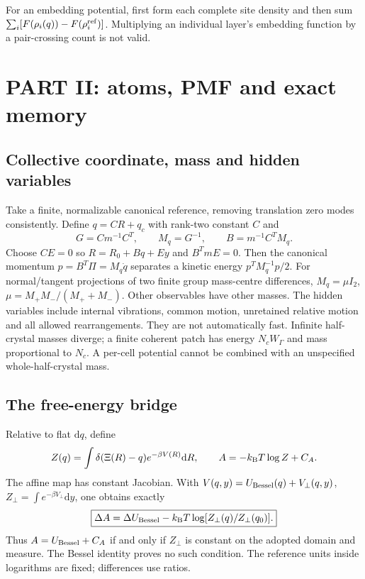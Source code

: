 \documentclass[11pt]{article}
\newcommand{\kb}{k_{\rm B}}
\newcommand{\dd}{\mathrm d}
\begin{document}
For an embedding potential, first form each complete site density and then
sum $\sum_i[F(\rho_i(q))-F(\rho_i^{\rm ref})]$. Multiplying an individual
layer's embedding function by a pair-crossing count is not valid.

\section{PART II: atoms, PMF and exact memory}
\subsection{Collective coordinate, mass and hidden variables}
Take a finite, normalizable canonical reference, removing translation zero
modes consistently. Define $q=CR+q_c$ with rank-two constant $C$ and
\begin{equation}
G=Cm^{-1}C^T,\qquad M_q=G^{-1},\qquad B=m^{-1}C^TM_q.
\end{equation}
Choose $CE=0$ so $R=R_0+Bq+Ey$ and $B^TmE=0$. Then the canonical momentum
$p=B^T\Pi=M_q\dot q$ separates a kinetic energy $p^TM_q^{-1}p/2$.
For normal/tangent projections of two finite group mass-centre differences,
$M_q=\mu I_2$, $\mu=M_+M_-/(M_++M_-)$. Other observables have other masses.
The hidden variables include internal vibrations, common motion, unretained
relative motion and all allowed rearrangements. They are not automatically
fast. Infinite half-crystal masses diverge; a finite coherent patch has
energy $N_cW_\Gamma$ and mass proportional to $N_c$. A per-cell potential
cannot be combined with an unspecified whole-half-crystal mass.

\subsection{The free-energy bridge}
Relative to flat $\dd q$, define
\begin{equation}
Z(q)=\int\delta(\Xi(R)-q)e^{-\beta V(R)}\dd R,\qquad
A=-\kb T\log Z+C_A.\label{eq:pmf}
\end{equation}
The affine map has constant Jacobian. With
$V(q,y)=U_{\rm Bessel}(q)+V_\perp(q,y)$,
$Z_\perp=\int e^{-\beta V_\perp}\dd y$, one obtains exactly
\begin{equation}
\boxed{\Delta A=\Delta U_{\rm Bessel}
                  -\kb T\log[Z_\perp(q)/Z_\perp(q_0)].}\label{eq:bridge}
\end{equation}
Thus $A=U_{\rm Bessel}+C_A$ if and only if $Z_\perp$ is constant on the
adopted domain and measure. The Bessel identity proves no such condition.
The reference units inside logarithms are fixed; differences use ratios.
\end{document}
